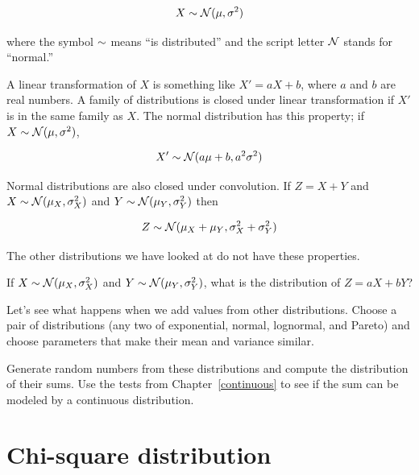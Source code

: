 \documentclass[12pt]{book}
\begin{document}
\[ X \sim \mathcal{N} (\mu, \sigma^2) \]

where the symbol $\sim$ means ``is distributed'' and the script letter
$\mathcal{N}$ stands for ``normal.''


A linear transformation of $X$ is something like $X' = aX + b$, where $a$
and $b$ are real numbers.  A family of distributions is closed under
linear transformation if $X'$ is in the same family as $X$.  The normal
distribution has this property; if $X \sim \mathcal{N} (\mu,
\sigma^2)$,

\[ X' \sim \mathcal{N} (a \mu + b, a^2 \sigma^2) \]

Normal distributions are also closed under convolution.  
If $Z = X+Y$ and
$X \sim \mathcal{N} (\mu_X, \sigma_X^2)$ and
$Y \sim \mathcal{N} (\mu_Y, \sigma_Y^2)$ then

\[ Z \sim \mathcal{N} (\mu_X + \mu_Y, \sigma_X^2 + \sigma_Y^2) \]

The other distributions we have looked at do not have these
properties.

\begin{ex}

If 
$X \sim \mathcal{N} (\mu_X, \sigma_X^2)$ and
$Y \sim \mathcal{N} (\mu_Y, \sigma_Y^2)$, what is the distribution
of $Z = aX + bY$?

\end{ex}

\begin{ex}

Let's see what happens when we add values from
other distributions.  Choose a pair of distributions (any two of
exponential, normal, lognormal, and Pareto) and choose parameters
that make their mean and variance similar.

Generate random numbers from these distributions and compute the
distribution of their sums.  Use the tests from
Chapter~\ref{continuous} to see if the sum can be modeled by a
continuous distribution.

\end{ex}


\section{Chi-square distribution}
\end{document}
